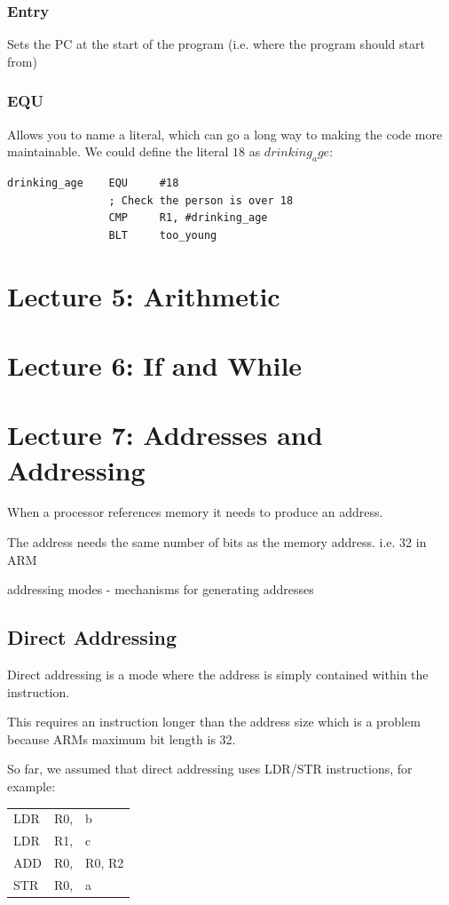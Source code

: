 \documentclass{article}
\begin{document}
\subsubsection{Entry}
Sets the PC at the start of the program (i.e. where the program should start from)

\subsubsection{EQU}
Allows you to name a literal, which can go a long way to making the code more maintainable. We could define the literal $18$ as $drinking_age$:

\begin{verbatim}
drinking_age	EQU 	#18
				; Check the person is over 18
				CMP 	R1, #drinking_age
				BLT		too_young
\end{verbatim}

\section{Lecture 5: Arithmetic}
\section{Lecture 6: If and While}

\section{Lecture 7: Addresses and Addressing}
When a processor references memory it needs to produce an address.

The address needs the same number of bits as the memory address. i.e. 32 in ARM

addressing modes - mechanisms for generating addresses

\subsection{Direct Addressing}
Direct addressing is a mode where the address is simply contained within the instruction.

This requires an instruction longer than the address size which is a problem because ARMs maximum bit length is 32.

So far, we assumed that direct addressing uses LDR/STR instructions, for example:

\begin{center}
    \begin{tabular}{l l l}
        LDR & R0, & b\\
        LDR & R1, & c\\
        ADD & R0, & R0, R2\\
        STR & R0, & a \\
    \end{tabular}
\end{center}
\end{document}
